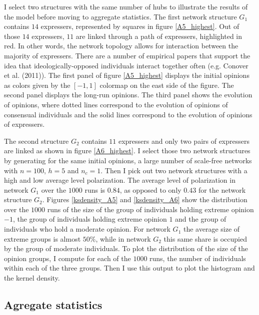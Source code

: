 \documentclass{article}
\begin{document}
I select two structures with the same number of hubs to illustrate the results of the model before moving to aggregate statistics.  The first network structure $G_1$ contains $14$ expressers, represented by squares in figure \ref{A5_highest}. Out of those $14$ expressers, $11$ are linked through a path of expressers, highlighted in red. In other words, the network topology allows for interaction between the majority of expressers. There are a number of empirical papers that support the idea that ideologically-opposed individuals interact together often (e.g. Conover et al. (2011)\cite{conover}). The first panel of figure \ref{A5_highest} displays the initial opinions as colors given by the $[-1,1]$ colormap on the east side of the figure. The second panel displays the long-run opinions. The third panel shows the evolution of opinions, where dotted lines correspond to the evolution of opinions of consensual individuals and the solid lines correspond to the evolution of opinions of expressers. 

The second structure $G_2$ contains $11$ expressers and only two pairs of expressers are linked as shown in figure \ref{A6_highest}.   
I select those two network structures by generating for the same initial opinions, a large number of scale-free networks with $n=100$, $h=5$ and $n_c=1$. Then I pick out two network structures with a high and  low average level polarization. The average level of polarization in network $G_1$ over the $1000$ runs is $0.84$, as opposed to only $0.43$ for the network structure $G_2$.  Figures \ref{ksdensity_A5} and \ref{ksdensity_A6} show the distribution over the $1000$ runs of the size of the group of individuals holding extreme opinion $-1$, the group of individuals holding extreme opinion $1$ and the group of individuals who hold a moderate opinion. For network $G_1$ the average size of extreme groups is almost $50\%$, while in network $G_2$ this same share is occupied by the group of moderate individuals. To plot the distribution of the size of the opinion groups, I compute  for each of the $1000$ runs, the number of individuals within each of the three groups. Then I use this output to plot the histogram and the kernel density.

\subsection{Agregate statistics}
\end{document}

